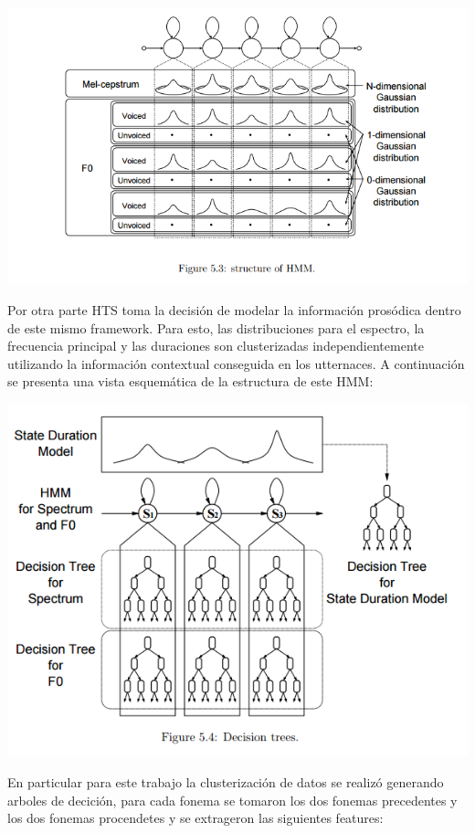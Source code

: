 \includegraphics[scale=0.5]{imagenes/hmm.png}

Por otra parte HTS toma la decisión de modelar la información prosódica dentro de este mismo framework. Para esto, las distribuciones para el espectro, la frecuencia principal y las duraciones son clusterizadas independientemente utilizando la información contextual conseguida en los utternaces. A continuación se presenta una vista esquemática de la estructura de este HMM:

\includegraphics[scale=0.5]{imagenes/hmmContext.png}

En particular para este trabajo la clusterización de datos se realizó generando arboles de decición, para cada fonema se tomaron los dos fonemas precedentes y los dos fonemas procendetes y se extrageron las siguientes features:

